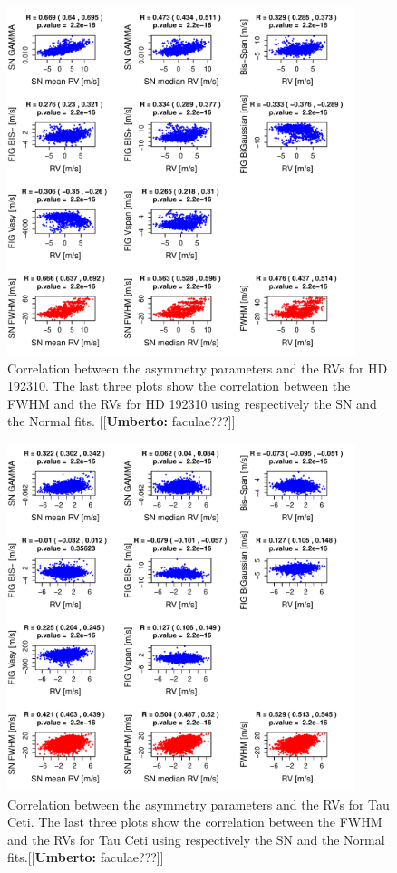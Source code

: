 \documentclass[11pt, oneside]{article}
\newcommand{\umberto}[1]{{\color{green}[[\textbf{Umberto: }#1]]}}
\begin{document}
{\begin{figure}[htbp]
   \centering
\includegraphics[height = 4in]{HD19231_[4]Comparison_para.pdf} 
   \caption{Correlation between the asymmetry parameters and the RVs for HD 192310. The last three plots show the correlation between the FWHM and the RVs for HD 192310 using respectively the SN and the Normal fits. \umberto{faculae???}}
   \label{fig:Gliese785:corrPlot}
\end{figure}

\begin{figure}[htbp]
   \centering
\includegraphics[height = 4in]{HD10700_[4]Comparison_para.pdf}  
   \caption{Correlation between the asymmetry parameters and the RVs for Tau Ceti. The last three plots show the correlation between the FWHM and the RVs for Tau Ceti using respectively the SN and the Normal fits.\umberto{faculae???}}
   \label{fig:Tau:corrPlot}
\end{figure}

}
\end{document}
